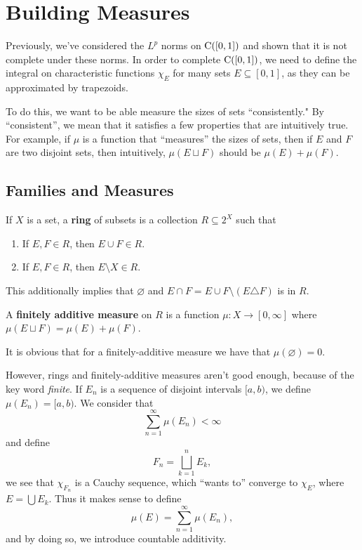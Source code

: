 \chapter{Building Measures}

Previously, we've considered the $L^p$ norms on $\mathrm C([0, 1])$ and shown that it is not complete under these norms. In order to complete $\mathrm C([0, 1])$, we need to define the integral on characteristic functions $\chi_E$ for many sets $E \subseteq [0, 1]$, as they can be approximated by trapezoids. 

To do this, we want to be able measure the sizes of sets ``consistently." By ``consistent'', we mean that it satisfies a few properties that are intuitively true. For example, if $\mu$ is a function that ``measures'' the sizes of sets, then if $E$ and $F$ are two disjoint sets, then intuitively, $\mu(E \sqcup F)$ should be $\mu(E) + \mu(F)$.

\section{Families and Measures}

\begin{definition}
    If $X$ is a set, a \textbf{ring} of subsets is a collection $R \subseteq 2^X$ such that \begin{enumerate}
        \item If $E, F \in R$, then $E \cup F \in R$.
        \item If $E, F \in R$, then $E \setminus X \in R$.
    \end{enumerate}
    This additionally implies that $\varnothing$ and $E \cap F = E \cup F \setminus (E \triangle F)$ is in $R$.

    A \textbf{finitely additive measure} on $R$ is a function $\mu \colon X \to [0, \infty]$ where $\mu(E \sqcup F) = \mu(E) + \mu(F)$.
\end{definition}

It is obvious that for a finitely-additive measure we have that $\mu(\varnothing) = 0$.

However, rings and finitely-additive measures aren't good enough, because of the key word \emph{finite}. If $E_n$ is a sequence of disjoint intervals $[a, b)$, we define $\mu(E_n) = [a, b)$. We consider that \[\sum_{n = 1}^\infty \mu(E_n) < \infty \] and define \[F_n = \bigsqcup_{k = 1}^n E_k,\] we see that $\chi_{F_n}$ is a Cauchy sequence, which ``wants to'' converge to $\chi_E$, where $E = \bigcup E_k$. Thus it makes sense to define \[\mu(E) = \sum_{n = 1}^\infty \mu(E_n),\] and by doing so, we introduce countable additivity.

